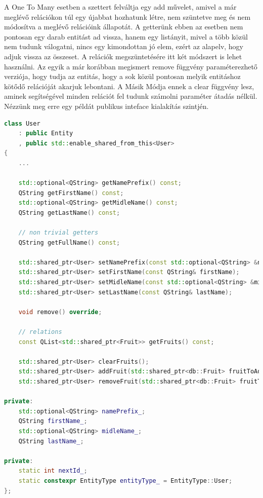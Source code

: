 A One To Many esetben a szettert felváltja egy add művelet, amivel a már meglévő relációkon túl egy újabbat hozhatunk létre, nem szüntetve meg és nem módosítva a meglévő relációink állapotát. A getterünk ebben az esetben nem pontosan egy darab entitást ad vissza, hanem egy listányit, mivel a több közül nem tudunk válogatni, nincs egy kimondottan jó elem, ezért az alapelv, hogy adjuk vissza az összeset. A relációk megszüntetésére itt két módszert is lehet használni. Az egyik a már korábban megismert remove függvény paraméterezhető verziója, hogy tudja az entitás, hogy a sok közül pontosan melyik entitáshoz kötődő relációját akarjuk lebontani. A Másik Módja ennek a clear függvény lesz, aminek segítségével minden relációt fel tudunk számolni paraméter átadás nélkül. Nézzünk meg erre egy példát publikus inteface kialakítás szintjén.

\begin{lstlisting}[language={C++}]
class User
    : public Entity
    , public std::enable_shared_from_this<User>
{
    ...
    
    std::optional<QString> getNamePrefix() const;
    QString getFirstName() const;
    std::optional<QString> getMidleName() const;
    QString getLastName() const;

    // non trivial getters
    QString getFullName() const;

    std::shared_ptr<User> setNamePrefix(const std::optional<QString> &namePrefix);
    std::shared_ptr<User> setFirstName(const QString& firstName);
    std::shared_ptr<User> setMidleName(const std::optional<QString> &midleName);
    std::shared_ptr<User> setLastName(const QString& lastName);

    void remove() override;

    // relations
    const QList<std::shared_ptr<Fruit>> getFruits() const;

    std::shared_ptr<User> clearFruits();
    std::shared_ptr<User> addFruit(std::shared_ptr<db::Fruit> fruitToAdd);
    std::shared_ptr<User> removeFruit(std::shared_ptr<db::Fruit> fruitToRemove);

private:
    std::optional<QString> namePrefix_;
    QString firstName_;
    std::optional<QString> midleName_;
    QString lastName_;

private:
    static int nextId_;
    static constexpr EntityType entityType_ = EntityType::User;
};
\end{lstlisting}

